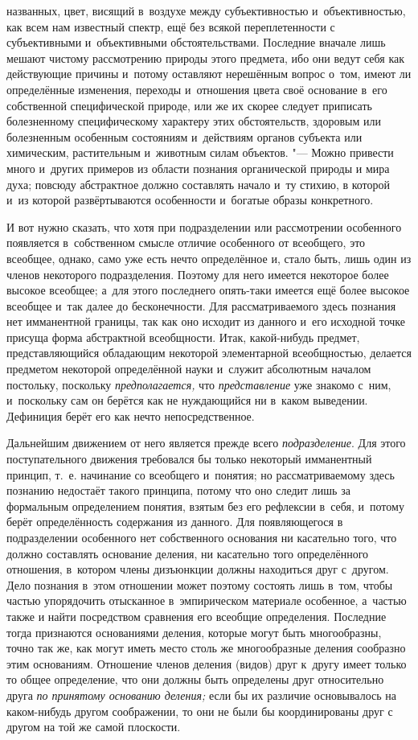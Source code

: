 названных, цвет, висящий в~воздухе между субъективностью и~объективностью,
как всем нам известный спектр, ещё без всякой переплетенности с
субъективными и~объективными обстоятельствами. Последние вначале лишь
мешают чистому рассмотрению природы этого предмета, ибо они ведут себя как
действующие причины и~потому оставляют нерешённым вопрос о~том, имеют ли
определённые изменения, переходы и~отношения цвета своё основание в~его
собственной специфической природе, или же их скорее следует приписать
болезненному специфическому характеру этих обстоятельств, здоровым или
болезненным особенным состояниям и~действиям органов субъекта или
химическим, растительным и~животным силам объектов. "--- Можно
привести много и~других примеров из области познания органической природы и
мира духа; повсюду абстрактное должно составлять начало и~ту стихию, в
которой и~из которой развёртываются особенности и~богатые образы
конкретного.

И вот нужно сказать, что хотя при подразделении или
рассмотрении особенного появляется в~собственном смысле отличие особенного
от всеобщего, это всеобщее, однако, само уже есть нечто определённое и,
стало быть, лишь один из членов некоторого подразделения. Поэтому для него
имеется некоторое более высокое всеобщее; а~для этого последнего опять-таки
имеется ещё более высокое всеобщее и~так далее до
бесконечности. Для рассматриваемого здесь познания нет имманентной границы,
так как оно исходит из данного и~его исходной точке присуща форма
абстрактной всеобщности. Итак, какой-нибудь предмет, представляющийся
обладающим некоторой элементарной всеобщностью, делается предметом
некоторой определённой науки и~служит абсолютным началом постольку,
поскольку {\em предполагается,}
что {\em представление}
уже знакомо с~ним, и~поскольку сам он берётся как не
нуждающийся ни в~каком выведении. Дефиниция берёт его как нечто
непосредственное.

Дальнейшим движением от него является прежде всего
{\em подразделение}. Для
этого поступательного движения требовался бы только некоторый имманентный
принцип, т.~е. начинание со всеобщего и~понятия; но рассматриваемому здесь
познанию недостаёт такого принципа, потому что оно следит лишь за
формальным определением понятия, взятым без его рефлексии в~себя, и~потому
берёт определённость содержания из данного. Для появляющегося в
подразделении особенного нет собственного основания ни касательно того, что
должно составлять основание деления, ни касательно того определённого
отношения, в~котором члены дизъюнкции должны находиться друг с~другом. Дело
познания в~этом отношении может поэтому состоять лишь в~том, чтобы частью
упорядочить отысканное в~эмпирическом материале особенное, а~частью также и
найти посредством сравнения его всеобщие определения. Последние тогда
признаются основаниями деления, которые могут быть многообразны, точно так
же, как могут иметь место столь же многообразные деления сообразно этим
основаниям. Отношение членов деления (видов) друг к~другу имеет только то
общее определение, что они должны быть определены друг относительно друга
{\em по принятому основанию деления;} если бы их различие основывалось на
каком-нибудь другом соображении, то они не были бы координированы друг
с другом на той же самой плоскости.

